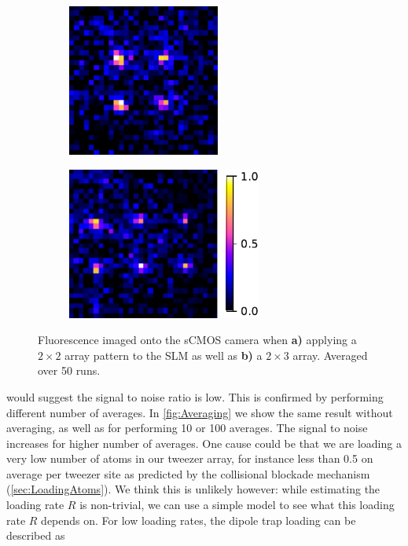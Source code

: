 \begin{figure}
    \centering
	\begin{subfigure}{.49\linewidth}
		\centering
		\includegraphics[height=5cm]{figures/2x2fluorescence.pdf}
		\caption{}
		\label{fig:fluor2x2}
	\end{subfigure}
	\hfill
	\begin{subfigure}{.49\linewidth}
		\centering
		\includegraphics[height=5cm]{figures/2x3fluorescence.pdf}
		\caption{}
		\label{fig:fluor2x3}
	\end{subfigure}
	\caption{
	Fluorescence imaged onto the sCMOS camera when \textsf{\textbf{a)}} applying a $2\times2$ array pattern to the SLM as well as \textsf{\textbf{b)}} a $2\times 3$ array.
	Averaged over 50 runs.
    }
    \label{fig:fluorescence}
\end{figure}
 would suggest the signal to noise ratio is low. 
This is confirmed by performing different number of averages.
In \cref{fig:Averaging} we show the same result without averaging, as well as for performing 10 or 100 averages.
The signal to noise increases for higher number of averages.
One cause could be that we are loading a very low number of atoms in our tweezer array, for instance less than 0.5 on average per tweezer site as predicted by the collisional blockade mechanism (\cref{sec:LoadingAtoms}).
We think this is unlikely however: while estimating the loading rate $R$ is non-trivial, we can use a simple model to see what this loading rate $R$ depends on. 
For low loading rates, the dipole trap loading can be described as \cite{Kuppens2000}


